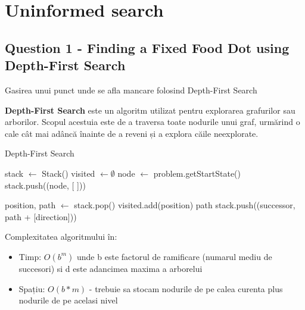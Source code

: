 \section{Uninformed search}
\subsection{Question 1 - Finding a Fixed Food Dot using Depth-First Search}
\par Gasirea unui punct unde se afla mancare folosind Depth-First Search
\par \textbf{Depth-First Search} este un algoritm utilizat pentru explorarea grafurilor sau arborilor. Scopul acestuia este de a traversa toate nodurile unui graf, urmărind o cale cât mai adâncă înainte de a reveni și a explora căile neexplorate.

\begin{algorithm}
\caption{Depth-First Search}
\begin{algorithmic}[1]
    \State stack $\gets$ Stack()
    \State visited $\gets \emptyset$
    \State node $\gets$ problem.getStartState()
    \State stack.push((node, [ ]))
    
        \State position, path $\gets$ stack.pop()
            \State visited.add(position)
                \Return path
            \EndIf
                    \State stack.push((successor, path + [direction]))
                \EndIf
            \EndFor
        \EndIf
    \EndWhile \\
    \Return [ ]
\EndFunction
\end{algorithmic}
\end{algorithm}

\par Complexitatea algoritmului în:

\begin{itemize}
    \item Timp: $O(b^m)$ unde b este factorul de ramificare (numarul mediu de succesori) si d este adancimea maxima a arborelui
    \item Spațiu: $O(b*m)$ - trebuie sa stocam nodurile de pe calea curenta plus nodurile de pe acelasi nivel 
\end{itemize}

